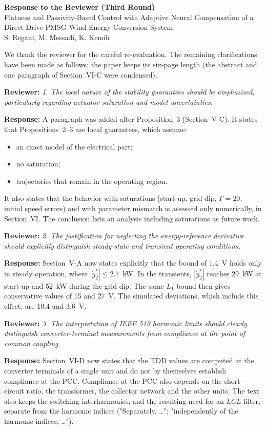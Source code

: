 \documentclass[11pt,a4paper]{article}
\newcommand{\rev}[1]{\par\medskip\noindent\textbf{Reviewer:} \emph{#1}\par\smallskip\noindent\textbf{Response:} }
\begin{document}
\begin{center}
{\Large\bfseries Response to the Reviewer (Third Round)}\\[4pt]
Flatness and Passivity-Based Control with Adaptive Neural Compensation of a Direct-Drive PMSG Wind Energy Conversion System\\[2pt]
S. Regani, M. Messadi, K. Kemih
\end{center}

We thank the reviewer for the careful re-evaluation. The remaining clarifications have been made as
follows; the paper keeps its six-page length (the abstract and one paragraph of Section~VI-C were
condensed).

\rev{1. The local nature of the stability guarantees should be emphasized, particularly regarding actuator saturation and model uncertainties.}
A paragraph was added after Proposition~3 (Section~V-C). It states that Propositions~2--3 are local
guarantees, which assume:
\begin{itemize}
\item an exact model of the electrical part;
\item no saturation;
\item trajectories that remain in the operating region.
\end{itemize}
It also states that the behavior with saturations (start-up, grid dip, $\Gamma=20$, initial speed
errors) and with parameter mismatch is assessed only numerically, in Section~VI. The conclusion lists
an analysis including saturations as future work.

\rev{2. The justification for neglecting the energy-reference derivative should explicitly distinguish steady-state and transient operating conditions.}
Section~V-A now states explicitly that the bound of 1.4~V holds only in steady operation, where
$|\dot y_2^*|\le2.7$~kW. In the transients, $|\dot y_2^*|$ reaches 29~kW at start-up and 52~kW during
the grid dip. The same $L_1$ bound then gives conservative values of 15 and 27~V. The simulated
deviations, which include this effect, are 10.4 and 3.6~V.

\rev{3. The interpretation of IEEE 519 harmonic limits should clearly distinguish converter-terminal measurements from compliance at the point of common coupling.}
Section~VI-D now states that the TDD values are computed at the converter terminals of a single unit
and do not by themselves establish compliance at the PCC. Compliance at the PCC also depends on the
short-circuit ratio, the transformer, the collector network and the other units. The text also keeps
the switching interharmonics, and the resulting need for an $LCL$ filter, separate from the harmonic
indices ("Separately, \dots"; "independently of the harmonic indices, \dots").
\end{document}
